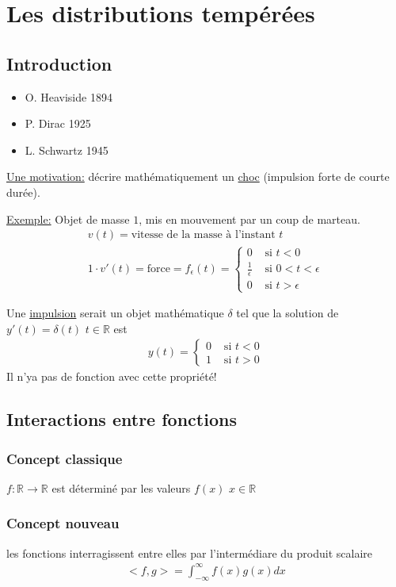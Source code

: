 \chapter{Les distributions tempérées}
\section{Introduction}
\begin{itemize}
	\item O. Heaviside 1894
	\item P. Dirac 1925
	\item L. Schwartz 1945
\end{itemize}
\underline{Une motivation:} décrire mathématiquement un \underline{choc} (impulsion forte de courte durée).

\underline{Exemple:} Objet de masse $1$, mis en mouvement par un coup de marteau.
\begin{eqnarray}
	v(t)=\text{vitesse de la masse à l'instant } t
	\\
	1\cdot v'(t)=\text{force}=f_\epsilon(t)=\begin{cases}
		0&\text{ si }t<0
		\\
		\frac{1}{\epsilon}&\text{ si }0<t<\epsilon
		\\
		0&\text{ si }t>\epsilon
	\end{cases}
\end{eqnarray}



Une \underline{impulsion} serait un objet mathématique $\delta$ tel que la solution de $y'(t)=\delta(t)$ $t\in \mathbb R$ est
\begin{eqnarray}
	y(t)=
	\begin{cases}
		0&\text{ si } t<0
		\\
		1&\text{ si } t>0
	\end{cases}
\end{eqnarray}
Il n'ya pas de fonction avec cette propriété!
\section{Interactions entre fonctions}
\subsection{Concept classique}
$f:\mathbb R\rightarrow\mathbb R$ est déterminé par les valeurs $f(x)$ $x\in\mathbb R$
\subsection{Concept nouveau}
les fonctions interragissent entre elles par l'intermédiare du produit scalaire
\begin{eqnarray}
	<f,g>=\int_{-\infty}^{\infty}f(x)g(x)dx
\end{eqnarray}

